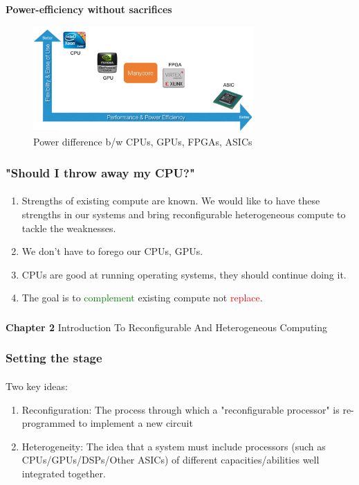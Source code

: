 \documentclass{beamer}
\begin{document}
{\begin{frame}[fragile]
  \textbf{Power-efficiency without sacrifices}

  \begin{figure}
    \centering
    \includegraphics[width=0.75\textwidth]{power.png}
    \caption{Power difference b/w CPUs, GPUs, FPGAs, ASICs}
    \label{}
  \end{figure}

\end{frame}

\begin{frame}[fragile]
  \frametitle{"Should I throw away my CPU?"}
  \framesubtitle{}
  \begin{enumerate}
    \item Strengths of existing compute are known. We would like
      to have these strengths in our systems and bring reconfigurable
      heterogeneous compute to tackle the weaknesses. 
    \item We don't have to forego our CPUs, GPUs.
    \item CPUs are good at running operating systems, they should continue
      doing it. 
    \item The goal is to \textcolor{green}{complement} existing compute not
      \textcolor{red}{replace}.
  \end{enumerate}

\end{frame}

\begin{frame}[c,fragile]
  \frametitle{}

  \centering
  \textbf{Chapter 2}
  \centering
  Introduction To Reconfigurable And Heterogeneous Computing
\end{frame}

\begin{frame}[fragile]
  \frametitle{Setting the stage}
  \framesubtitle{}
    Two key ideas:
      \begin{enumerate}
        \item Reconfiguration: The process through which a "reconfigurable
      processor" is re-programmed to implement a new circuit
    \item Heterogeneity: The idea that a system must include processors (such as
      CPUs/GPUs/DSPs/Other ASICs) of different 
          capacities/abilities well integrated together.
      \end{enumerate}
\end{frame}

}
\end{document}
